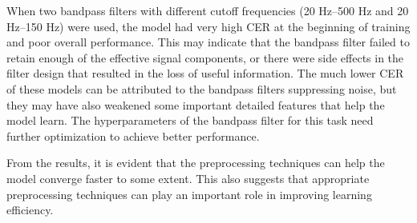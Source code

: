 When two bandpass filters with different cutoff frequencies (20 Hz–500 Hz and 20 Hz–150 Hz) were used, the model had very high CER at the beginning of training and poor overall performance. This may indicate that the bandpass filter failed to retain enough of the effective signal components, or there were side effects in the filter design that resulted in the loss of useful information. The much lower CER of these models can be attributed to the bandpass filters suppressing noise, but they may have also weakened some important detailed features that help the model learn. The hyperparameters of the bandpass filter for this task need further optimization to achieve better performance.

From the results, it is evident that the preprocessing techniques can help the model converge faster to some extent. This also suggests that appropriate preprocessing techniques can play an important role in improving learning efficiency.